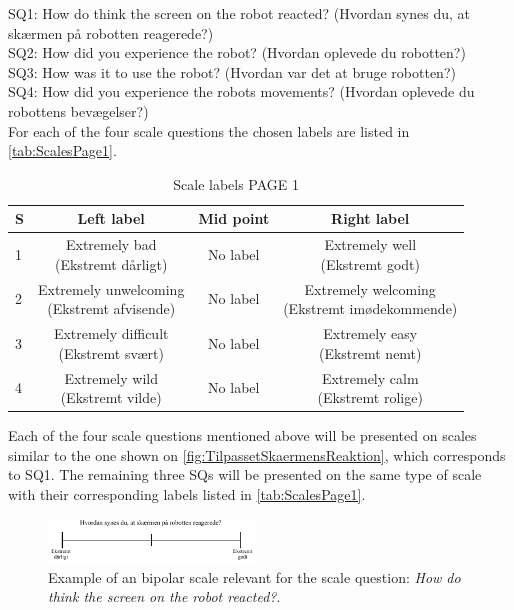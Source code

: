 \noindent
SQ1: How do think the screen on the robot reacted? (Hvordan synes du, at skærmen på robotten reagerede?)\\
SQ2: How did you experience the robot? (Hvordan oplevede du robotten?)\\
SQ3: How was it to use the robot? (Hvordan var det at bruge robotten?)\\
SQ4: How did you experience the robots movements? (Hvordan oplevede du robottens bevægelser?)\\
For each of the four scale questions the chosen labels are listed in \autoref{tab:ScalesPage1}.
%
\begin{table}[H]
	\centering
\caption{Scale labels PAGE 1}
	\label{tab:ScalesPage1} 
	\begin{tabular}{l|c|c|c}
		S     & Left label & Mid point & Right label \\\hline
		1   & \makecell{Extremely bad\\(Ekstremt dårligt)}  & No label & \makecell{Extremely well \\(Ekstremt godt)}        \\\hline
		2   & \makecell{Extremely unwelcoming \\(Ekstremt afvisende)} & No label & \makecell{Extremely welcoming \\(Ekstremt imødekommende)}         \\\hline
		3   & \makecell{Extremely difficult \\(Ekstremt svært)} & No label & \makecell{Extremely easy \\(Ekstremt nemt)}         \\\hline
	 	4   & \makecell{Extremely wild \\(Ekstremt vilde)} & No label & \makecell{Extremely calm \\(Ekstremt rolige)}               
	\end{tabular}        
\end{table}
\noindent
%
Each of the four scale questions mentioned above will be presented on scales similar to the one shown on \autoref{fig:TilpassetSkaermensReaktion}, which corresponds to SQ1. The remaining three SQs will be presented on the same type of scale with their corresponding labels listed in \autoref{tab:ScalesPage1}.  
%
\begin{figure}[H]
\centering
\includegraphics[width = 0.49\textwidth]{Figure/TilpassetSkaermensReaktion}
\setlength{} 
\caption{Example of an bipolar scale relevant for the scale question: \textit{How do think the screen on the robot reacted?}.}
\label{fig:TilpassetSkaermensReaktion}
\end{figure}
